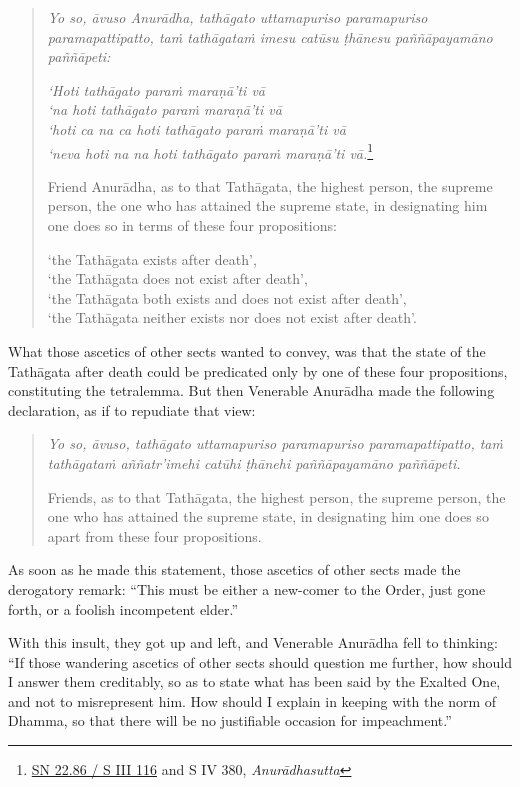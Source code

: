 \begin{quote}
\emph{Yo so, āvuso Anurādha, tathāgato uttamapuriso paramapuriso paramapattipatto, taṁ tathāgataṁ imesu catūsu ṭhānesu paññāpayamāno paññāpeti:}

\emph{`Hoti tathāgato paraṁ maraṇā'ti vā\\
`na hoti tathāgato paraṁ maraṇā'ti vā\\
`hoti ca na ca hoti tathāgato paraṁ maraṇā'ti vā\\
`neva hoti na na hoti tathāgato paraṁ maraṇā'ti vā.}\footnote{\href{https://suttacentral.net/sn22.86/pli/ms}{SN 22.86 / S III 116} and S IV 380, \emph{Anurādhasutta}}

Friend Anurādha, as to that Tathāgata, the highest person, the supreme person, the one who has attained the supreme state, in designating him one does so in terms of these four propositions:

`the Tathāgata exists after death',\\
`the Tathāgata does not exist after death',\\
`the Tathāgata both exists and does not exist after death',\\
`the Tathāgata neither exists nor does not exist after death'.
\end{quote}

What those ascetics of other sects wanted to convey, was that the state of the Tathāgata after death could be predicated only by one of these four propositions, constituting the tetralemma. But then Venerable Anurādha made the following declaration, as if to repudiate that view:

\begin{quote}
\emph{Yo so, āvuso, tathāgato uttamapuriso paramapuriso paramapattipatto, taṁ tathāgataṁ aññatr'imehi catūhi ṭhānehi paññāpayamāno paññāpeti.}

Friends, as to that Tathāgata, the highest person, the supreme person, the one who has attained the supreme state, in designating him one does so apart from these four propositions.
\end{quote}

As soon as he made this statement, those ascetics of other sects made the derogatory remark: ``This must be either a new-comer to the Order, just gone forth, or a foolish incompetent elder.''

With this insult, they got up and left, and Venerable Anurādha fell to thinking: ``If those wandering ascetics of other sects should question me further, how should I answer them creditably, so as to state what has been said by the Exalted One, and not to misrepresent him. How should I explain in keeping with the norm of Dhamma, so that there will be no justifiable occasion for impeachment.''


